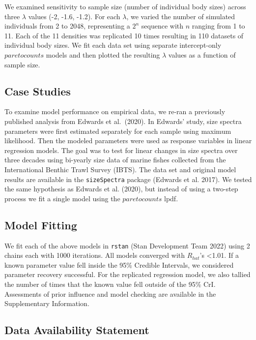 \documentclass[
  12pt,
]{article}
\numberwithin{equation}
\begin{document}
We examined sensitivity to sample size (number of individual body sizes)
across three \(\lambda\) values (-2, -1.6, -1.2). For each \(\lambda\),
we varied the number of simulated individuals from 2 to 2048,
representing a \(2^n\) sequence with \(n\) ranging from 1 to 11. Each of
the 11 densities was replicated 10 times resulting in 110 datasets of
individual body sizes. We fit each data set using separate
intercept-only \(paretocounts\) models and then plotted the resulting
\(\lambda\) values as a function of sample size.

\hypertarget{case-studies}{%
\subsection{Case Studies}\label{case-studies}}

To examine model performance on empirical data, we re-ran a previously
published analysis from Edwards et al.~(2020). In Edwards' study, size
spectra parameters were first estimated separately for each sample using
maximum likelihood. Then the modeled parameters were used as response
variables in linear regression models. The goal was to test for linear
changes in size spectra over three decades using bi-yearly size data of
marine fishes collected from the International Benthic Trawl Survey
(IBTS). The data set and original model results are available in the
\texttt{sizeSpectra} package (Edwards et al. 2017). We tested the same
hypothesis as Edwards et al. (2020), but instead of using a two-step
process we fit a single model using the \(paretocounts\) lpdf.

\hypertarget{model-fitting}{%
\subsection{Model Fitting}\label{model-fitting}}

We fit each of the above models in \texttt{rstan} (Stan Development Team
2022) using 2 chains each with 1000 iterations. All models converged
with \(R_{hat}\)'s \textless1.01. If a known parameter value fell inside
the 95\% Credible Intervals, we considered parameter recovery
successful. For the replicated regression model, we also tallied the
number of times that the known value fell outside of the 95\% CrI.
Assessments of prior influence and model checking are available in the
Supplementary Information.

\hypertarget{data-availability-statement}{%
\subsection{Data Availability
Statement}\label{data-availability-statement}}
\end{document}
